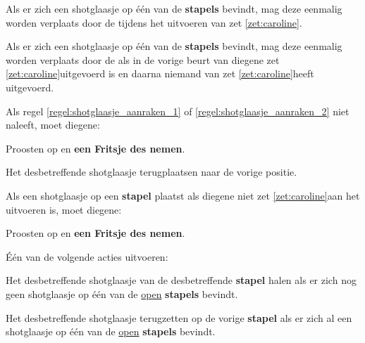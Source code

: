 
\vervolgLijst{}
\item \label{regel:shotglaasje_aanraken_1} Als er zich een shotglaasje op \'e\'en van de \textbf{stapels} bevindt, mag deze eenmalig worden verplaats door de \huidigeSpeler tijdens het uitvoeren van zet \ref{zet:caroline}\footnotemark[2].
\eindLijst{}

\vervolgLijst{}
\item \label{regel:shotglaasje_aanraken_2} Als er zich een shotglaasje op \'e\'en van de \textbf{stapels} bevindt, mag deze eenmalig worden verplaats door de \huidigeSpeler als in de vorige beurt van diegene zet \ref{zet:caroline}\footnotemark[2] uitgevoerd is en daarna niemand van \alleSpelers zet \ref{zet:caroline}\footnotemark[2] heeft uitgevoerd.
\eindLijst{}

\vervolgLijst{}
\item Als \eenSpeler regel \ref{regel:shotglaasje_aanraken_1} of \ref{regel:shotglaasje_aanraken_2} niet naleeft, moet diegene:
\puntLijst{}
\item Proosten op  en \textbf{een Fritsje des nemen}\footnotemark[1].
\item Het desbetreffende shotglaasje terugplaatsen naar de vorige positie.
\eindPuntLijst{}
\eindLijst{}


\vervolgLijst{}
\item Als \eenSpeler een shotglaasje op een \textbf{stapel} plaatst als diegene niet zet \ref{zet:caroline}\footnotemark[2] aan het uitvoeren is, moet diegene:
\puntLijst{}
\item Proosten op  en \textbf{een Fritsje des nemen}\footnotemark[1].
\item Één van de volgende acties uitvoeren:
\numeriekeLijst{}
\item Het desbetreffende shotglaasje van de desbetreffende \textbf{stapel} halen als er zich nog geen shotglaasje op \'e\'en van de \ul{open} \textbf{stapels} bevindt.
\item Het desbetreffende shotglaasje terugzetten op de vorige \textbf{stapel} als er zich al een shotglaasje op \'e\'en van de \ul{open} \textbf{stapels} bevindt.
\eindNumeriekeLijst{}
\eindPuntLijst{}
\eindLijst{}


